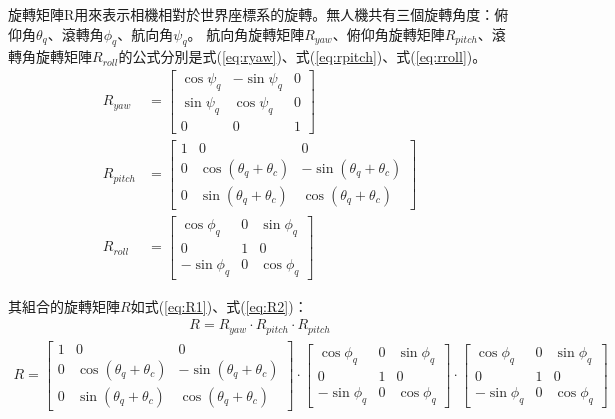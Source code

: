 \documentclass[12pt]{article}       %
\begin{document}
旋轉矩陣R用來表示相機相對於世界座標系的旋轉。無人機共有三個旋轉角度：俯仰角$\theta_{q}$、滾轉角$\phi_{q}$、航向角$\psi_{q}$。
航向角旋轉矩陣$R_{yaw}$、俯仰角旋轉矩陣$R_{pitch}$、滾轉角旋轉矩陣$R_{roll}$的公式分別是式(\ref{eq:ryaw})、式(\ref{eq:rpitch})、式(\ref{eq:rroll})。
\begin{align}
    R_{yaw} &=
    \begin{bmatrix}
        \cos\psi_{q}   & -\sin\psi_{q}  & 0 \\
        \sin\psi_{q}   & \cos\psi_{q}   & 0 \\
        0              & 0              & 1
    \end{bmatrix} 
    \label{eq:ryaw}
    \\
    R_{pitch} &=
    \begin{bmatrix}
        1   & 0  & 0 \\
        0   & \cos(\theta_{q}+\theta_{c})   & -\sin(\theta_{q}+\theta_{c}) \\
        0   & \sin(\theta_{q}+\theta_{c})   & \cos(\theta_{q}+\theta_{c})
    \end{bmatrix} 
    \label{eq:rpitch}
    \\
    R_{roll} &=
    \begin{bmatrix}
        \cos\phi_{q}    & 0     & \sin\phi_{q}  \\
        0               & 1     & 0             \\
        -\sin\phi_{q}   & 0     & \cos\phi_{q}
    \end{bmatrix} 
    \label{eq:rroll}
\end{align}

其組合的旋轉矩陣$R$如式(\ref{eq:R1})、式(\ref{eq:R2})：
\begin{align}
    R=R_{yaw}\cdot R_{pitch} \cdot R_{pitch}
    \label{eq:R1}
\end{align}
\begin{align}
    R=
    \begin{bmatrix}
        1   & 0  & 0 \\
        0   & \cos(\theta_{q}+\theta_{c})   & -\sin(\theta_{q}+\theta_{c}) \\
        0   & \sin(\theta_{q}+\theta_{c})   & \cos(\theta_{q}+\theta_{c})
    \end{bmatrix}
    \cdot
    \begin{bmatrix}
        \cos\phi_{q}    & 0     & \sin\phi_{q}  \\
        0               & 1     & 0             \\
        -\sin\phi_{q}   & 0     & \cos\phi_{q}
    \end{bmatrix} 
    \cdot
    \begin{bmatrix}
        \cos\phi_{q}    & 0     & \sin\phi_{q}  \\
        0               & 1     & 0             \\
        -\sin\phi_{q}   & 0     & \cos\phi_{q}
    \end{bmatrix} 
    \label{eq:R2}
\end{align}
\end{document}

